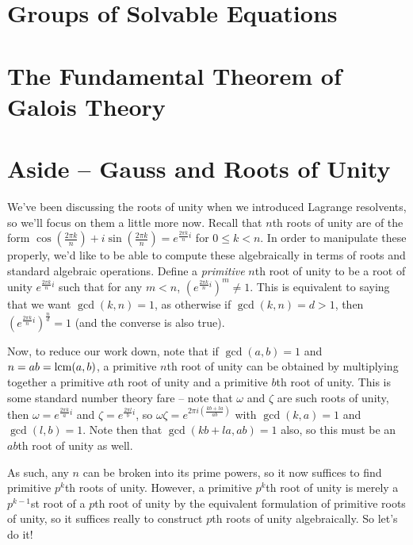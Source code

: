 \documentclass[12pt]{scrartcl}
\begin{document}
\section{Groups of Solvable Equations}



\section{The Fundamental Theorem of Galois Theory}

\section{Aside -- Gauss and Roots of Unity}
We've been discussing the roots of unity when we introduced Lagrange resolvents, so we'll focus on them a little more now. Recall that $n$th roots of unity are of the form $\cos\left(\frac{2\pi k} n \right) + i \sin \left( \frac{2\pi k} n \right) = e^{\frac{2\pi k}n i}$ for $0 \leq k < n$. In order to manipulate these properly, we'd like to be able to compute these algebraically in terms of roots and standard algebraic operations. Define a \textit{primitive} $n$th root of unity to be a root of unity $e^{\frac{2\pi k}n i}$ such that for any $m < n$, $(e^{\frac{2\pi k}n i})^m \neq 1$. This is equivalent to saying that we want $\gcd(k, n) = 1$, as otherwise if $\gcd(k, n) = d > 1$, then $(e^{\frac{2\pi k}n i})^{\frac n d} = 1$ (and the converse is also true). 

Now, to reduce our work down, note that if $\gcd(a, b) = 1$ and $n = ab = \operatorname*{lcm}(a, b)$, a primitive $n$th root of unity can be obtained by multiplying together a primitive $a$th root of unity and a primitive $b$th root of unity. This is some standard number theory fare -- note that $\omega$ and $\zeta$ are such roots of unity, then $\omega = e^{\frac{2\pi k}a i}$ and $\zeta = e^{\frac{2\pi l}b i}$, so $\omega \zeta = e^{2\pi i (\frac {kb + la}{ab})}$ with $\gcd(k, a) = 1$ and $\gcd(l, b) = 1$. Note then that $\gcd(kb + la, ab) = 1$ also, so this must be an $ab$th root of unity as well. 

As such, any $n$ can be broken into its prime powers, so it now suffices to find primitive $p^k$th roots of unity. However, a primitive $p^k$th root of unity is merely a $p^{k-1}$st root of a $p$th root of unity by the equivalent formulation of primitive roots of unity, so it suffices really to construct $p$th roots of unity algebraically. So let's do it!  
\end{document}
